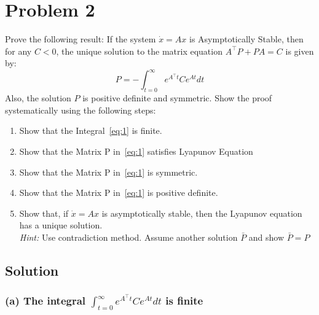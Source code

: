 \section*{Problem 2}

Prove the following result:
If the system \( \dot{x}=A x \) is Asymptotically Stable, then for any \( C<0 \), the unique solution to the matrix equation \( A^{\top} P+P A=C \) is given by:
\begin{equation*}\label{eq:1}
    P=-\int_{t=0}^{\infty} e^{A^{\top} t} C e^{A t} d t \tag{1}
\end{equation*}
Also, the solution \( P \) is positive definite and symmetric.
Show the proof systematically using the following steps:
\begin{enumerate}[label= (\alph*)]
    \item Show that the Integral~\ref{eq:1} is finite.
    \item Show that the Matrix P in~\ref{eq:1} satisfies Lyapunov Equation
    \item Show that the Matrix P in~\ref{eq:1} is symmetric.
    \item Show that the Matrix P in~\ref{eq:1} is positive definite.
    \item Show that, if \( \dot{x}=A x \) is asymptotically stable, then the Lyapunov equation has a unique solution. \\
          \textit{Hint:} Use contradiction method. Assume another solution \( \bar{P} \) and show \( \bar{P}=P \)
\end{enumerate}

\subsection*{Solution}

\subsubsection*{(a) The integral \( \displaystyle \int_{t=0}^{\infty} e^{A^{\top} t} C e^{A t} d t \) is finite}


